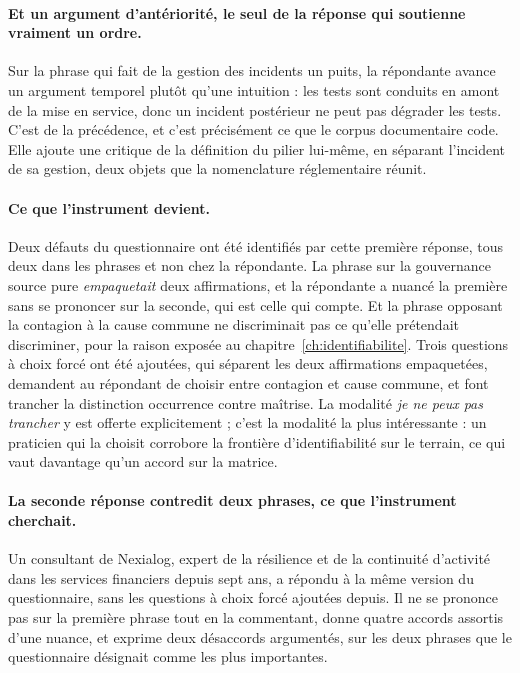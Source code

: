 \paragraph{Et un argument d'antériorité, le seul de la réponse qui soutienne vraiment un
ordre.} Sur la phrase qui fait de la gestion des incidents un puits, la répondante avance un
argument temporel plutôt qu'une intuition : les tests sont conduits en amont de la mise en
service, donc un incident postérieur ne peut pas dégrader les tests. C'est de la précédence, et
c'est précisément ce que le corpus documentaire code. Elle ajoute une critique de la définition
du pilier lui-même, en séparant l'incident de sa gestion, deux objets que la nomenclature
réglementaire réunit.

\paragraph{Ce que l'instrument devient.} Deux défauts du questionnaire ont été identifiés par
cette première réponse, tous deux dans les phrases et non chez la répondante. La phrase sur la
gouvernance source pure \emph{empaquetait} deux affirmations, et la répondante a nuancé la
première sans se prononcer sur la seconde, qui est celle qui compte. Et la phrase opposant la
contagion à la cause commune ne discriminait pas ce qu'elle prétendait discriminer, pour la
raison exposée au chapitre~\ref{ch:identifiabilite}. Trois questions à choix forcé ont été
ajoutées,
qui séparent les deux affirmations empaquetées, demandent au répondant de choisir entre
contagion et cause commune, et font trancher la distinction occurrence contre maîtrise. La
modalité \emph{je ne peux pas trancher} y est offerte explicitement ; c'est la modalité la plus
intéressante : un praticien qui la choisit corrobore la frontière d'identifiabilité sur le
terrain, ce qui vaut davantage qu'un accord sur la matrice.

\paragraph{La seconde réponse contredit deux phrases, ce que l'instrument cherchait.}
Un consultant de Nexialog, expert de la résilience et de la continuité d'activité dans les
services financiers depuis sept ans, a répondu à la même version du questionnaire, sans les
questions à choix forcé ajoutées depuis. Il ne se prononce pas sur la première phrase tout en la
commentant, donne quatre accords assortis d'une nuance, et exprime deux désaccords argumentés,
sur les deux phrases que le questionnaire désignait comme les plus importantes.

